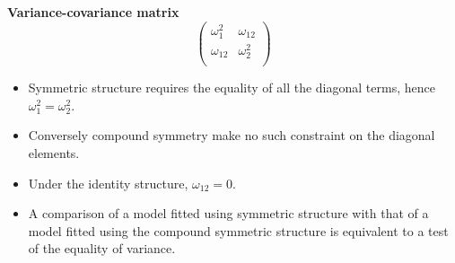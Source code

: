 \documentclass[compress]{beamer}        %
\makeatletter
\newcommand{\tcb}{\textcolor{beamer@blendedblue}}
\makeatother
\begin{document}
\begin{frame}{\bf \tcb{Variance-covariance matrix}}
\[\left( \begin{array}{cc}
              \omega^2_1  & \omega_{12} \\
              \omega_{12} & \omega^2_2 \\
\end{array}\right) \]
\begin{itemize}
\item Symmetric structure requires the equality of all the diagonal terms, hence $\omega^2_1 = \omega^2_2$. 
\item Conversely compound symmetry make no such constraint on the diagonal elements. 
\item Under the identity structure, $\omega_{12} = 0$.
\item A comparison of a model fitted using symmetric structure with that of a model fitted using the compound symmetric structure is equivalent to a test of the equality of variance.

\end{itemize}



\end{frame}


%
%



\end{document}

